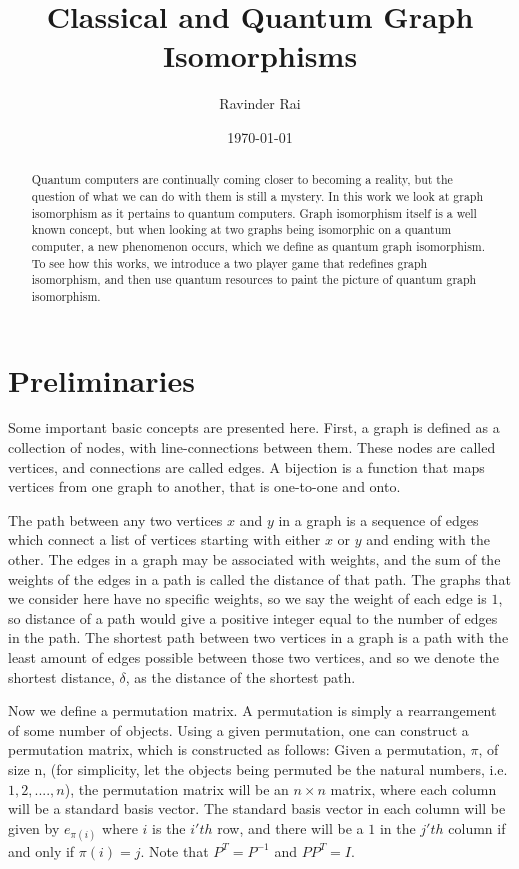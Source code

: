 \documentclass[12pt]{article}
\title{\textbf{Classical and Quantum Graph Isomorphisms}}
\author{Ravinder Rai}
\date{\today}
\begin{document}
 

\maketitle


\begin{abstract}
Quantum computers are continually coming closer to becoming a reality, but the question of what we can do with them is still a mystery. In this work we look at graph isomorphism as it pertains to quantum computers. Graph isomorphism itself is a well known concept, but when looking at two graphs being isomorphic on a quantum computer, a new phenomenon occurs, which we define as quantum graph isomorphism. To see how this works, we introduce a two player game that redefines graph isomorphism, and then use quantum resources to paint the picture of quantum graph isomorphism. 
\end{abstract}

\newpage
\section{Preliminaries}
Some important basic concepts are presented here. First, a graph is defined as a collection of nodes, with line-connections between them. These nodes are called vertices, and connections are called edges. A bijection is a function that maps vertices from one graph to another, that is one-to-one and onto.

The path between any two vertices $x$ and $y$ in a graph is a sequence of edges which connect a list of vertices starting with either $x$ or $y$ and ending with the other. The edges in a graph may be associated with weights, and the sum of the weights of the edges in a path is called the distance of that path. The graphs that we consider here have no specific weights, so we say the weight of each edge is $1$, so distance of a path would give a positive integer equal to the number of edges in the path. The shortest path between two vertices in a graph is a path with the least amount of edges possible between those two vertices, and so we denote the shortest distance, $\delta$, as the distance of the shortest path. 


Now we define a permutation matrix. A permutation is simply a rearrangement of some number of objects. Using a given permutation, one can construct a permutation matrix, which is constructed as follows: Given a permutation, $\pi$, of size n, (for simplicity, let the objects being permuted be the natural numbers, i.e. $1, 2, ...., n$), the permutation matrix will be an $n \times n$ matrix, where each column will be a standard basis vector. The standard basis vector in each column will be given by $e_{\pi(i)}$ where $i$ is the $i'th$ row, and there will be a $1$ in the $j'th$ column if and only if $\pi(i) = j$. Note that $P^T = P^{-1}$ and $PP^T = I$. 
\end{document}
